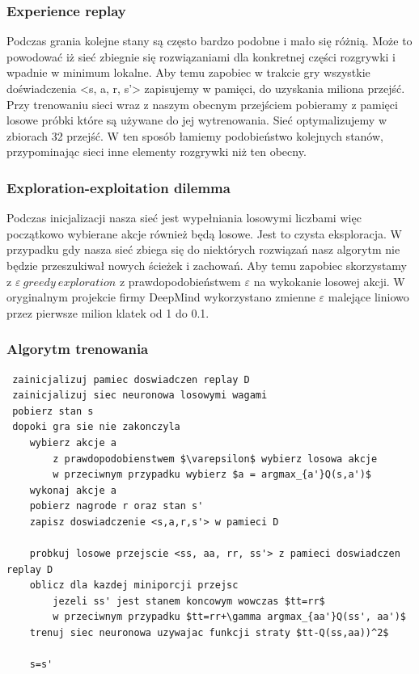 \documentclass[12pt]{article}
\begin{document}
\subsubsection{Experience replay}

Podczas grania kolejne stany są często bardzo podobne i mało się różnią. Może to powodować iż sieć zbiegnie się rozwiązaniami dla konkretnej części rozgrywki i wpadnie w minimum lokalne. Aby temu zapobiec w trakcie gry wszystkie doświadczenia <s, a, r, s'> zapisujemy w pamięci, do uzyskania miliona przejść.  Przy trenowaniu sieci wraz z naszym obecnym przejściem pobieramy z pamięci losowe próbki które są używane do jej wytrenowania. Sieć optymalizujemy w zbiorach 32 przejść. W ten sposób łamiemy podobieństwo kolejnych stanów, przypominając sieci inne elementy rozgrywki niż ten obecny. 

\subsubsection{Exploration-exploitation dilemma}

Podczas inicjalizacji nasza sieć jest wypełniania losowymi liczbami więc początkowo wybierane akcje również będą losowe. Jest to czysta eksploracja. W przypadku gdy nasza sieć zbiega się do niektórych rozwiązań nasz algorytm nie będzie przeszukiwał nowych ścieżek i zachowań. Aby temu zapobiec skorzystamy z $\varepsilon\ greedy\ exploration$ z prawdopodobieństwem $\varepsilon$ na wykokanie losowej akcji. W oryginalnym projekcie firmy DeepMind wykorzystano zmienne $\varepsilon$ malejące liniowo przez pierwsze milion klatek od 1 do 0.1.

\subsubsection{Algorytm trenowania}

\begin{lstlisting}
 zainicjalizuj pamiec doswiadczen replay D
 zainicjalizuj siec neuronowa losowymi wagami
 pobierz stan s
 dopoki gra sie nie zakonczyla
	wybierz akcje a
		z prawdopodobienstwem $\varepsilon$ wybierz losowa akcje
		w przeciwnym przypadku wybierz $a = argmax_{a'}Q(s,a')$
	wykonaj akcje a
	pobierz nagrode r oraz stan s'
	zapisz doswiadczenie <s,a,r,s'> w pamieci D
	
	probkuj losowe przejscie <ss, aa, rr, ss'> z pamieci doswiadczen replay D
	oblicz dla kazdej miniporcji przejsc
		jezeli ss' jest stanem koncowym wowczas $tt=rr$
		w przeciwnym przypadku $tt=rr+\gamma argmax_{aa'}Q(ss', aa')$
	trenuj siec neuronowa uzywajac funkcji straty $tt-Q(ss,aa))^2$
	
	s=s'

\end{lstlisting}
\end{document}
